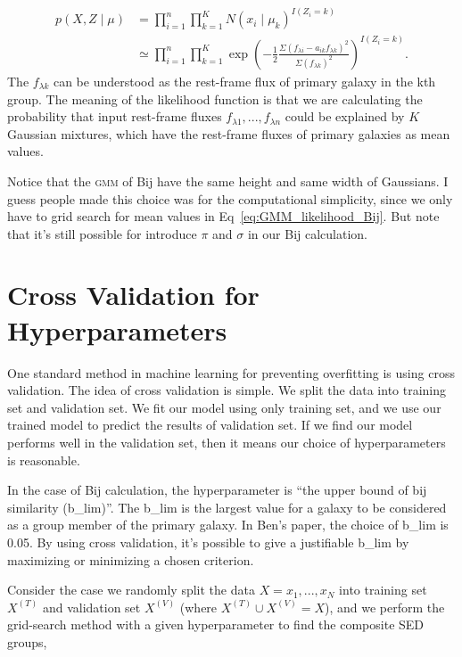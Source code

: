 \documentclass[12pt,letterpaper]{article}
\begin{document}
\begin{equation}
    \begin{split}
        p(X, Z \mid \mu) 
        &= 
        \prod_{i=1}^{n} \prod_{k=1}^{K} 
        N(x_i \mid \mu_k)^{I(Z_i = k)}\\
        &\simeq 
        \prod_{i=1}^{n} \prod_{k=1}^{K} 
        \exp{\left( - \frac{1}{2}  \frac{ \Sigma (f_{\lambda i} - a_{ik} f_{\lambda k} )^2 }{ \Sigma (f_{\lambda k})^2 }  \right)}^{I(Z_i = k)}.
    \end{split}
    \label{eq:GMM_likelihood_Bij}
\end{equation}
The $f_{\lambda k}$ can be understood as the rest-frame flux
of primary galaxy in the kth group.
The meaning of the likelihood function is that we are calculating the
probability that input rest-frame fluxes 
$f_{\lambda 1}, ..., f_{\lambda n}$
could be explained by $K$ Gaussian mixtures, 
which have the rest-frame fluxes of primary galaxies as mean values.

Notice that the \textsc{gmm} of Bij have the same height and same width of Gaussians.
I guess people made this choice was for the computational simplicity, 
since we only have to grid search for mean values in Eq~\ref{eq:GMM_likelihood_Bij}.
But note that it's still possible for introduce $\pi$ and $\sigma$ in our Bij calculation.

\section*{Cross Validation for Hyperparameters}

One standard method in machine learning for preventing overfitting is using cross validation.
The idea of cross validation is simple.
We split the data into training set and validation set.
We fit our model using only training set, and we use our trained model to predict the results of validation set.
If we find our model performs well in the validation set, then it means our choice of hyperparameters is reasonable. 

In the case of Bij calculation, the hyperparameter is ``the upper bound of bij similarity (b\_lim)''.
The b\_lim is the largest value for a galaxy to be considered as a group member of the primary galaxy.
In Ben's paper, the choice of b\_lim is 0.05.
By using cross validation, it's possible to give a justifiable b\_lim by maximizing or minimizing a chosen criterion.

Consider the case we randomly split the data $X = x_1, ..., x_N$ into training set $X^{(T)}$ and validation set $X^{(V)}$ (where $X^{(T)} \cup X^{(V)} = X$), and we perform the grid-search method with a given hyperparameter to find the composite SED groups,
\end{document}
